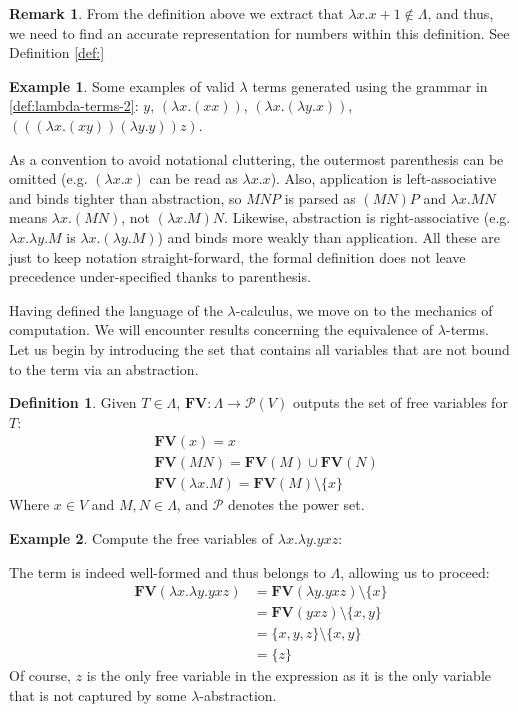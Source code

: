 \documentclass[12pt]{book}
\newcommand{\la}{\lambda}
\newcommand{\La}{\Lambda}
\newcommand{\Vset}{V}
\newcommand{\lcalc}{$\la$-calculus}
\newcommand{\lterms}{$\la$-terms}
\newcommand{\functionfont}[1]{\mathbf{#1}}
\newcommand{\FV}[1]{\functionfont{FV}(#1)}
\theoremstyle{plain}
\theoremstyle{definition}
\newtheorem{definition}{Definition}[section]
\theoremstyle{definition}
\newtheorem{example}{Example}[section]
\theoremstyle{definition}
\newtheorem*{remark}{Remark}
\begin{document}
\begin{remark}
  From the definition above we extract that \( \lambda x . x + 1 \notin \La \), and thus, we need to find an accurate representation for numbers within this definition. See Definition \ref{def:}
\end{remark}
\begin{example} Some examples of valid $\la$ terms generated using the grammar in \ref{def:lambda-terms-2}:
  \( y \),
  \( (\la x. (x x)) \),
  \( (\la x. (\la y. x)) \),
  \( (((\la x. (x y)) (\la y. y)) z) \).
\end{example}
As a convention to avoid notational cluttering, the outermost parenthesis can be omitted (e.g. $ ( \la x.x ) $ can be read as $ \la x.x $). Also, application is left-associative  and binds tighter than abstraction, so $M N P$ is parsed as $(M N) P$ and $\la x . M N$ means $\la x . (M N)$, not $(\la x . M) N$. Likewise, abstraction is right-associative (e.g. $\la x . \la y . M$ is $\la x . (\la y . M)$) and binds more weakly than application. All these are just to keep notation straight-forward, the formal definition does not leave precedence under-specified thanks to parenthesis.

Having defined the language of the \lcalc, we move on to the mechanics of computation. We will encounter results concerning the equivalence of \lterms. Let us begin by introducing the set that contains all variables that are not bound to the term via an abstraction.
\begin{definition} Given $T \in \La $, $\functionfont{FV} : \La \to \mathcal{P}(\Vset) $ outputs the set of free variables for $T$:
  \begin{align*}
    & \FV x = {x}\\
    & \FV {MN} = \FV M \cup \FV N \\
    & \FV {\lambda x . M} = \FV M \setminus \{x\}
  \end{align*}
  Where $ x \in \Vset $ and $ M, N \in \La $, and $\mathcal{P}$ denotes the power set.
\end{definition}
\begin{example}
  Compute the free variables of $\lambda x . \lambda y . y x z$:
  
  The term is indeed well-formed and thus belongs to $\La$, allowing us to proceed:
  \begin{align*}
    \FV {\lambda x . \lambda y . y x z} &= \FV {\lambda y . yxz} \setminus \{x\} \\
                                        &= \FV {yxz} \setminus \{x, y\} \\
                                        &= \{x, y, z\} \setminus \{x, y\} \\
                                        &= \{z\}
  \end{align*}
  Of course, $z$ is the only free variable in the expression as it is the only variable that is not captured by some $\la$-abstraction.
\end{example}
\end{document}

